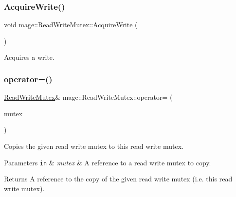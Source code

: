 \subsubsection{\texorpdfstring{Acquire\+Write()}{AcquireWrite()}}
{\footnotesize\ttfamily void mage\+::\+Read\+Write\+Mutex\+::\+Acquire\+Write (\begin{DoxyParamCaption}{ }\end{DoxyParamCaption})\hspace{0.3cm}{\ttfamily [private]}}

Acquires a write. \hypertarget{structmage_1_1_read_write_mutex_a408e06f3c8bcc644e43afbf7e9ac772f}{}\label{structmage_1_1_read_write_mutex_a408e06f3c8bcc644e43afbf7e9ac772f} 
\subsubsection{\texorpdfstring{operator=()}{operator=()}\hspace{0.1cm}{\footnotesize\ttfamily [1/2]}}
{\footnotesize\ttfamily \hyperlink{structmage_1_1_read_write_mutex}{Read\+Write\+Mutex}\& mage\+::\+Read\+Write\+Mutex\+::operator= (\begin{DoxyParamCaption}\item[{const \hyperlink{structmage_1_1_read_write_mutex}{Read\+Write\+Mutex} \&}]{mutex }\end{DoxyParamCaption})\hspace{0.3cm}{\ttfamily [delete]}}

Copies the given read write mutex to this read write mutex.


\begin{DoxyParams}[1]{Parameters}
\mbox{\tt in}  & {\em mutex} & A reference to a read write mutex to copy. \\
\hline
\end{DoxyParams}
\begin{DoxyReturn}{Returns}
A reference to the copy of the given read write mutex (i.\+e. this read write mutex). 
\end{DoxyReturn}
\hypertarget{structmage_1_1_read_write_mutex_a14ea4d1be75046741a7663e0d86a017a}{}\label{structmage_1_1_read_write_mutex_a14ea4d1be75046741a7663e0d86a017a} 
